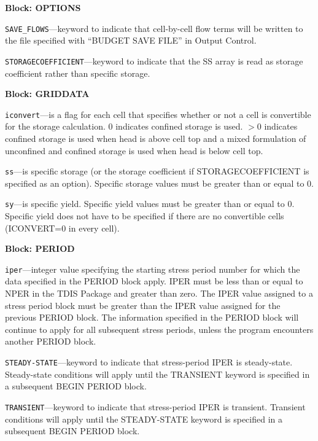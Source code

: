 
\item \textbf{Block: OPTIONS}

\begin{description}
\item \texttt{SAVE\_FLOWS}---keyword to indicate that cell-by-cell flow terms will be written to the file specified with ``BUDGET SAVE FILE'' in Output Control.

\item \texttt{STORAGECOEFFICIENT}---keyword to indicate that the SS array is read as storage coefficient rather than specific storage.

\end{description}
\item \textbf{Block: GRIDDATA}

\begin{description}
\item \texttt{iconvert}---is a flag for each cell that specifies whether or not a cell is convertible for the storage calculation. 0 indicates confined storage is used. $>$0 indicates confined storage is used when head is above cell top and a mixed formulation of unconfined and confined storage is used when head is below cell top.

\item \texttt{ss}---is specific storage (or the storage coefficient if STORAGECOEFFICIENT is specified as an option). Specific storage values must be greater than or equal to 0.

\item \texttt{sy}---is specific yield. Specific yield values must be greater than or equal to 0. Specific yield does not have to be specified if there are no convertible cells (ICONVERT=0 in every cell).

\end{description}
\item \textbf{Block: PERIOD}

\begin{description}
\item \texttt{iper}---integer value specifying the starting stress period number for which the data specified in the PERIOD block apply.  IPER must be less than or equal to NPER in the TDIS Package and greater than zero.  The IPER value assigned to a stress period block must be greater than the IPER value assigned for the previous PERIOD block.  The information specified in the PERIOD block will continue to apply for all subsequent stress periods, unless the program encounters another PERIOD block.

\item \texttt{STEADY-STATE}---keyword to indicate that stress-period IPER is steady-state. Steady-state conditions will apply until the TRANSIENT keyword is specified in a subsequent BEGIN PERIOD block.

\item \texttt{TRANSIENT}---keyword to indicate that stress-period IPER is transient. Transient conditions will apply until the STEADY-STATE keyword is specified in a subsequent BEGIN PERIOD block.

\end{description}

